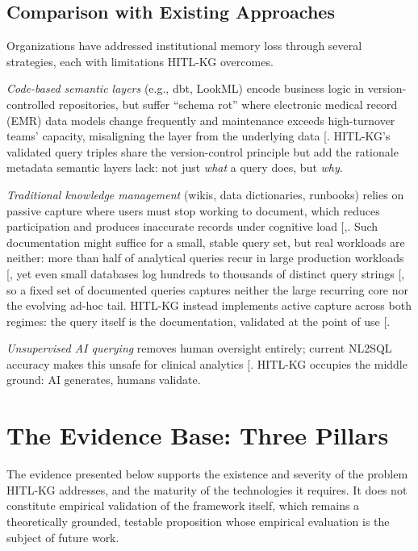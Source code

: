 \documentclass[
  american,
  11pt,
  letterpaper,
  oneside  ,captions=tableheading
]{scrartcl}
\begin{document}
\subsection{Comparison with Existing
Approaches}\label{comparison-with-existing-approaches}

Organizations have addressed institutional memory loss through several
strategies, each with limitations HITL-KG overcomes.

\emph{Code-based semantic layers} (e.g., dbt, LookML) encode business
logic in version-controlled repositories, but suffer ``schema rot''
where electronic medical record (EMR) data models change frequently and
maintenance exceeds high-turnover teams' capacity, misaligning the layer
from the underlying data {[}\citeproc{ref-battula2025}{35}{]}. HITL-KG's
validated query triples share the version-control principle but add the
rationale metadata semantic layers lack: not just \emph{what} a query
does, but \emph{why}.

\emph{Traditional knowledge management} (wikis, data dictionaries,
runbooks) relies on passive capture where users must stop working to
document, which reduces participation and produces inaccurate records
under cognitive load
{[},\citeproc{ref-goffin2011}{26}{]}. Such
documentation might suffice for a small, stable query set, but real
workloads are neither: more than half of analytical queries recur in
large production workloads {[}\citeproc{ref-jindal2019}{36}{]}, yet even
small databases log hundreds to thousands of distinct query strings
{[}\citeproc{ref-kul2018}{37}{]}, so a fixed set of documented queries
captures neither the large recurring core nor the evolving ad-hoc tail.
HITL-KG instead implements active capture across both regimes: the query
itself is the documentation, validated at the point of use
{[}\citeproc{ref-moore2018}{28}{]}.

\emph{Unsupervised AI querying} removes human oversight entirely;
current NL2SQL accuracy makes this unsafe for clinical analytics
{[}\citeproc{ref-ziletti2024}{38}{]}. HITL-KG occupies the middle
ground: AI generates, humans validate.

\section{The Evidence Base: Three
Pillars}\label{the-evidence-base-three-pillars}

The evidence presented below supports the existence and severity of the
problem HITL-KG addresses, and the maturity of the technologies it
requires. It does not constitute empirical validation of the framework
itself, which remains a theoretically grounded, testable proposition
whose empirical evaluation is the subject of future work.
\end{document}
